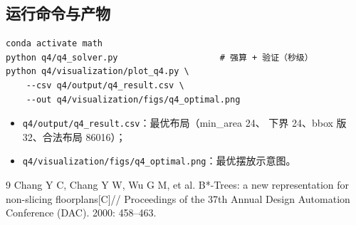 \documentclass[12pt,a4paper]{article}
\begin{document}
\subsection{运行命令与产物}

{\small
\begin{verbatim}
conda activate math
python q4/q4_solver.py                    # 强算 + 验证（秒级）
python q4/visualization/plot_q4.py \
    --csv q4/output/q4_result.csv \
    --out q4/visualization/figs/q4_optimal.png
\end{verbatim}
}

\begin{itemize}
    \item \texttt{q4/output/q4\_result.csv}：最优布局（min\_area 24、
    下界 24、bbox 版 32、合法布局 86016）；
    \item \texttt{q4/visualization/figs/q4\_optimal.png}：最优摆放示意图。
\end{itemize}

\begin{thebibliography}{9}
\bibitem{bstar} Chang Y C, Chang Y W, Wu G M, et al. B*-Trees: a new
  representation for non-slicing floorplans[C]// Proceedings of the 37th
  Annual Design Automation Conference (DAC). 2000: 458--463.
\end{thebibliography}
\end{document}
